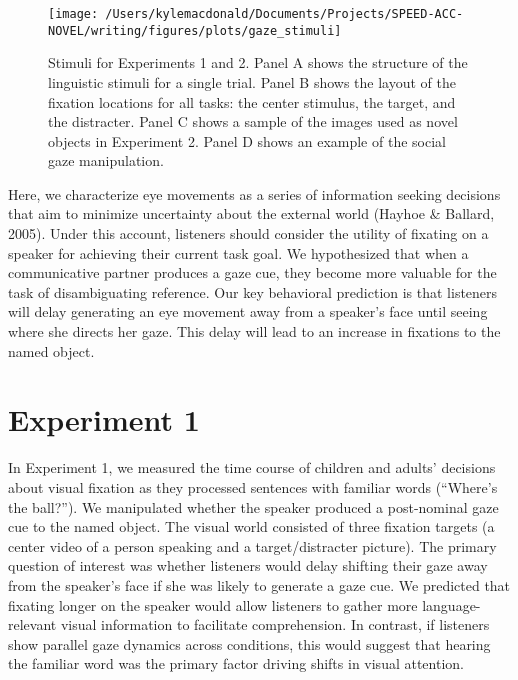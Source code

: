 \documentclass[10pt, letterpaper]{article}
\newenvironment{CodeChunk}{}{}
\begin{document}
\begin{CodeChunk}
\begin{figure*}[h]

{\centering \texttt{[image: /Users/kylemacdonald/Documents/Projects/SPEED-ACC-NOVEL/writing/figures/plots/gaze\_stimuli]} 

}

\caption[Stimuli for Experiments 1 and 2]{Stimuli for Experiments 1 and 2. Panel A shows the structure of the linguistic stimuli for a single trial. Panel B shows the layout of the fixation locations for all tasks: the center stimulus, the target, and the distracter. Panel C shows a sample of the images used as novel objects in Experiment 2. Panel D shows an example of the social gaze manipulation.}\label{fig:gaze-stimuli}
\end{figure*}
\end{CodeChunk}

Here, we characterize eye movements as a series of information seeking
decisions that aim to minimize uncertainty about the external world
(Hayhoe \& Ballard, 2005). Under this account, listeners should consider
the utility of fixating on a speaker for achieving their current task
goal. We hypothesized that when a communicative partner produces a gaze
cue, they become more valuable for the task of disambiguating reference.
Our key behavioral prediction is that listeners will delay generating an
eye movement away from a speaker's face until seeing where she directs
her gaze. This delay will lead to an increase in fixations to the named
object.

\hypertarget{experiment-1}{%
\section{Experiment 1}\label{experiment-1}}

In Experiment 1, we measured the time course of children and adults'
decisions about visual fixation as they processed sentences with
familiar words (``Where's the ball?''). We manipulated whether the
speaker produced a post-nominal gaze cue to the named object. The visual
world consisted of three fixation targets (a center video of a person
speaking and a target/distracter picture). The primary question of
interest was whether listeners would delay shifting their gaze away from
the speaker's face if she was likely to generate a gaze cue. We
predicted that fixating longer on the speaker would allow listeners to
gather more language-relevant visual information to facilitate
comprehension. In contrast, if listeners show parallel gaze dynamics
across conditions, this would suggest that hearing the familiar word was
the primary factor driving shifts in visual attention.
\end{document}
